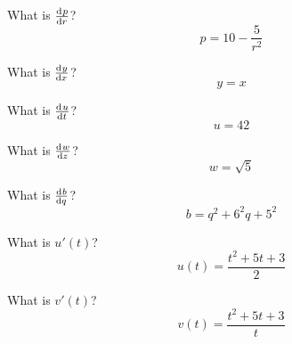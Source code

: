 \begin{ProblemSet}
 \begin{Problem}
  What is $\frac{\mathrm{d}^{{}}p}{\mathrm{d} r^{{}}}$?
  \begin{equation*}
   p = 10 - \frac{5}{r^2}
  \end{equation*}
 \end{Problem}

 \begin{Problem}
  What is $\frac{\mathrm{d}^{{}}y}{\mathrm{d} x^{{}}}$?
  \begin{equation*}
   y = x
  \end{equation*}
 \end{Problem}

 \begin{Problem}
  What is $\frac{\mathrm{d}^{{}}u}{\mathrm{d} t^{{}}}$?
  \begin{equation*}
   u = 42
  \end{equation*}
 \end{Problem}

 \begin{Problem}
  What is $\frac{\mathrm{d}^{{}}w}{\mathrm{d} z^{{}}}$?
  \begin{equation*}
   w = \sqrt{5}
  \end{equation*}
 \end{Problem}

 \begin{Problem}
  What is $\frac{\mathrm{d}^{{}}b}{\mathrm{d} q^{{}}}$?
  \begin{equation*}
   b = q^2 + 6^2 q + 5^2
  \end{equation*}
 \end{Problem}

 \begin{Problem}
  What is $u'(t)$?
  \begin{equation*}
   u(t) = \frac{t^2 + 5 t + 3}{2}
  \end{equation*}
 \end{Problem}

  \begin{Problem}
  What is $v'(t)$?
  \begin{equation*}
   v(t) = \frac{t^2 + 5 t + 3}{t}
  \end{equation*}
 \end{Problem}

\end{ProblemSet}


